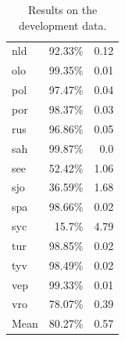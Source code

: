 \documentclass[11pt,a4paper]{article}
\newcommand\jp[1]{\textbf{JP: #1}}
\begin{document}
\begin{table}[ht!]
\begin{tabular}{lrr}
  nld & 92.33\% & 0.12 \\
  olo & 99.35\% & 0.01 \\
  pol & 97.47\% & 0.04 \\
  por & 98.37\% & 0.03 \\
  rus & 96.86\% & 0.05 \\
  sah & 99.87\% & 0.0 \\
  see & 52.42\% & 1.06 \\
  sjo & 36.59\% & 1.68 \\
  spa & 98.66\% & 0.02 \\
  syc & 15.7\% & 4.79 \\
  tur & 98.85\% & 0.02 \\
  tyv & 98.49\% & 0.02 \\
  vep & 99.33\% & 0.01 \\
  vro & 78.07\% & 0.39 \\
  \hline
  Mean & 80.27\% & 0.57
\end{tabular} 
\caption{Results on the development data.}
\label{tab:accuracy-dev}
\end{table}







\end{document}

